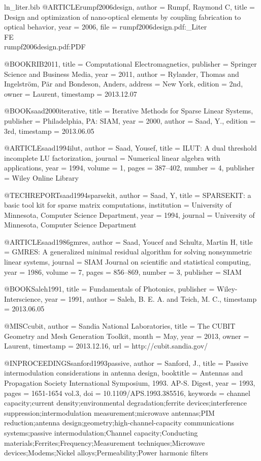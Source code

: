 \begin{filecontents*}{ln_liter.bib}
@ARTICLE{rumpf2006design,
  author = {Rumpf, Raymond C},
  title = {Design and optimization of nano-optical elements by coupling fabrication
	to optical behavior},
  year = {2006},
  file = {rumpf2006design.pdf:_Liter\\FE\\rumpf2006design.pdf:PDF}
}

@BOOK{RIB2011,
  title = {Computational Electromagnetics},
  publisher = {Springer Science and Business Media},
  year = {2011},
  author = {Rylander, Thomas and Ingelstr\"om, P\"ar and Bondeson, Anders},
  address = {New York},
  edition = {2nd},
  owner = {Laurent},
  timestamp = {2013.12.07}
}

@BOOK{saad2000iterative,
  title = {Iterative Methods for Sparse Linear Systems},
  publisher = {Philadelphia, PA: SIAM},
  year = {2000},
  author = {Saad, Y.},
  edition = {3rd},
  timestamp = {2013.06.05}
}

@ARTICLE{saad1994ilut,
  author = {Saad, Yousef},
  title = {{ILUT}: A dual threshold incomplete {LU} factorization},
  journal = {Numerical linear algebra with applications},
  year = {1994},
  volume = {1},
  pages = {387--402},
  number = {4},
  publisher = {Wiley Online Library}
}

@TECHREPORT{saad1994sparsekit,
  author = {Saad, Y},
  title = {{SPARSEKIT}: a basic tool kit for sparse matrix computations},
  institution = {University of Minnesota, Computer Science Department},
  year = {1994},
  journal = {University of Minnesota, Computer Science Department}
}

@ARTICLE{saad1986gmres,
  author = {Saad, Youcef and Schultz, Martin H},
  title = {{GMRES}: A generalized minimal residual algorithm for solving nonsymmetric
	linear systems},
  journal = {SIAM Journal on scientific and statistical computing},
  year = {1986},
  volume = {7},
  pages = {856--869},
  number = {3},
  publisher = {SIAM}
}

@BOOK{Saleh1991,
  title = {Fundamentals of Photonics},
  publisher = {Wiley-Interscience},
  year = {1991},
  author = {Saleh, B. E. A. and Teich, M. C.},
  timestamp = {2013.06.05}
}

@MISC{cubit,
  author = {{Sandia National Laboratories}},
  title = {The CUBIT Geometry and Mesh Generation Toolkit},
  month = {May},
  year = {2013},
  owner = {Laurent},
  timestamp = {2013.12.16},
  url = {{http://cubit.sandia.gov/}}
}

@INPROCEEDINGS{sanford1993passive,
  author = {Sanford, J.},
  title = {Passive intermodulation considerations in antenna design},
  booktitle = {Antennas and Propagation Society International Symposium, 1993. AP-S.
	Digest},
  year = {1993},
  pages = {1651-1654 vol.3},
  doi = {10.1109/APS.1993.385516},
  keywords = {channel capacity;current density;environmental degradation;ferrite
	devices;interference suppression;intermodulation measurement;microwave
	antennas;PIM reduction;antenna design;geometry;high-channel-capacity
	communications systems;passive intermodulation;Channel capacity;Conducting
	materials;Ferrites;Frequency;Measurement techniques;Microwave devices;Modems;Nickel
	alloys;Permeability;Power harmonic filters}
}


\end{filecontents*}

